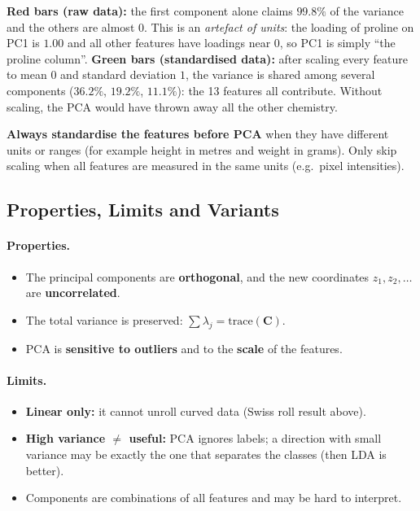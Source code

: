 \begin{explain}
\textbf{Red bars (raw data):} the first component alone claims $99.8\%$ of the variance and the others are almost $0$. This is an \emph{artefact of units}: the loading of proline on PC1 is $1.00$ and all other features have loadings near $0$, so PC1 is simply ``the proline column''. \textbf{Green bars (standardised data):} after scaling every feature to mean $0$ and standard deviation $1$, the variance is shared among several components ($36.2\%$, $19.2\%$, $11.1\%$): the 13 features all contribute. Without scaling, the PCA would have thrown away all the other chemistry.
\end{explain}

\begin{warning}
\textbf{Always standardise the features before PCA} when they have different units or ranges (for example height in metres and weight in grams). Only skip scaling when all features are measured in the same units (e.g.\ pixel intensities).
\end{warning}

\subsection{Properties, Limits and Variants}

\paragraph{Properties.}
\begin{itemize}
  \item The principal components are \textbf{orthogonal}, and the new coordinates $z_1,z_2,\dots$ are \textbf{uncorrelated}.
  \item The total variance is preserved: $\sum\lambda_j=\text{trace}(\mathbf C)$.
  \item PCA is \textbf{sensitive to outliers} and to the \textbf{scale} of the features.
\end{itemize}

\paragraph{Limits.}
\begin{itemize}
  \item \textbf{Linear only:} it cannot unroll curved data (Swiss roll result above).
  \item \textbf{High variance $\neq$ useful:} PCA ignores labels; a direction with small variance may be exactly the one that separates the classes (then LDA is better).
  \item Components are combinations of all features and may be hard to interpret.
\end{itemize}

